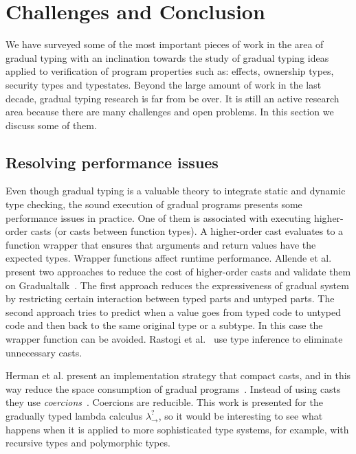\documentclass{article}
\newcommand\gstlc[0]{$\lambda^?_{\rightarrow}$}
\newcommand\gradualtalk[0]{Gradualtalk}
\begin{document}
\section{Challenges and Conclusion}\label{section:discussion}
We have surveyed some of the most important pieces of work in the area of gradual typing with an inclination towards the study of gradual typing ideas applied to verification of program properties such as: effects, ownership types, security types and typestates. Beyond the large amount of work in the last decade, gradual typing research is far from be over. It is still an active research area because there are many challenges and open problems. In this section we discuss some of them.

\subsection{Resolving performance issues}
Even though gradual typing is a valuable theory to integrate static and dynamic type checking, the sound execution of gradual programs presents some performance issues in practice. One of them is associated with executing higher-order casts (or casts between function types). A higher-order cast evaluates to a function wrapper that ensures that arguments and return values have the expected types. Wrapper functions affect runtime performance. Allende et al.~\cite{allendeAl:oopsla2014} present two approaches to reduce the cost of higher-order casts and validate them on \gradualtalk~\cite{allendeAl:scp2014}. The first approach reduces the expressiveness of gradual system by restricting certain interaction between typed parts and untyped parts. The second approach tries to predict when a value goes from typed code to untyped code and then back to the same original type or a subtype. In this case the wrapper function can be avoided. Rastogi et al.~\cite{rastogi:popl2012} use type inference to eliminate unnecessary casts.

Herman et al. present an implementation strategy that compact casts, and in this way reduce the space consumption of gradual programs~\cite{hermanAl:hosc10}. Instead of using casts they use \emph{coercions}~\cite{henglein:esop94}. Coercions are reducible. This work is presented for the gradually typed lambda calculus \gstlc \:, so it would be interesting to see what happens when it is applied to more sophisticated type systems, for example, with recursive types and polymorphic types.
\end{document}
